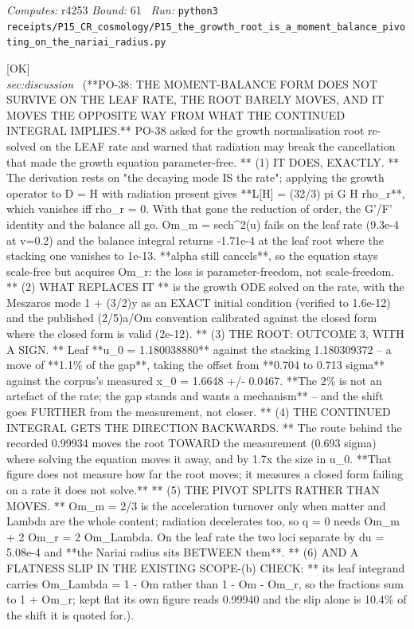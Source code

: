 \begin{description}
\emph{Computes:} r4253
 \emph{Bound:} 61
\ \emph{Run:} \texttt{python3 receipts/P15\_CR\_cosmology/P15\_the\_growth\_root\_is\_a\_moment\_balance\_pivoting\_on\_the\_nariai\_radius.py}
\item[\rcptlabel{P15_the_growth_root_on_the_leaf_rate_is_not_a_moment_balance_and_the_gap_stands}{P15R13}\textbf{P15R13}\quad\texttt{P15\_the\_growth\_root\_on\_the\_leaf\_rate\_is\_not\_a\_moment\_balance\_and\_the\_gap\_stands}]\hfill\textsf{[OK]}\\
\textit{sec:discussion} \ (**PO-38: THE MOMENT-BALANCE FORM DOES NOT SURVIVE ON THE LEAF RATE, THE ROOT BARELY MOVES, AND IT MOVES THE OPPOSITE WAY FROM WHAT THE CONTINUED INTEGRAL IMPLIES.** PO-38 asked for the growth normalisation root re-solved on the LEAF rate and warned that radiation may break the cancellation that made the growth equation parameter-free. ** (1) IT DOES, EXACTLY. ** The derivation rests on "the decaying mode IS the rate"; applying the growth operator to D = H with radiation present gives **L[H] = (32/3) pi G H rho\_r**, which vanishes iff rho\_r = 0. With that gone the reduction of order, the G'/F' identity and the balance all go. Om\_m = sech\textasciicircum{}2(u) fails on the leaf rate (9.3e-4 at v=0.2) and the balance integral returns -1.71e-4 at the leaf root where the stacking one vanishes to 1e-13. **alpha still cancels**, so the equation stays scale-free but acquires Om\_r: the loss is parameter-freedom, not scale-freedom. ** (2) WHAT REPLACES IT ** is the growth ODE solved on the rate, with the Meszaros mode 1 + (3/2)y as an EXACT initial condition (verified to 1.6e-12) and the published (2/5)a/Om convention calibrated against the closed form where the closed form is valid (2e-12). ** (3) THE ROOT: OUTCOME 3, WITH A SIGN. ** Leaf **u\_0 = 1.180038880** against the stacking 1.180309372 -- a move of **1.1\% of the gap**, taking the offset from **0.704 to 0.713 sigma** against the corpus's measured x\_0 = 1.6648 +/- 0.0467. **The 2\% is not an artefact of the rate; the gap stands and wants a mechanism** -- and the shift goes FURTHER from the measurement, not closer. ** (4) THE CONTINUED INTEGRAL GETS THE DIRECTION BACKWARDS. ** The route behind the recorded 0.99934 moves the root TOWARD the measurement (0.693 sigma) where solving the equation moves it away, and by 1.7x the size in u\_0. **That figure does not measure how far the root moves; it measures a closed form failing on a rate it does not solve.** ** (5) THE PIVOT SPLITS RATHER THAN MOVES. ** Om\_m = 2/3 is the acceleration turnover only when matter and Lambda are the whole content; radiation decelerates too, so q = 0 needs Om\_m + 2 Om\_r = 2 Om\_Lambda. On the leaf rate the two loci separate by du = 5.08e-4 and **the Nariai radius sits BETWEEN them**. ** (6) AND A FLATNESS SLIP IN THE EXISTING SCOPE-(b) CHECK: ** its leaf integrand carries Om\_Lambda = 1 - Om rather than 1 - Om - Om\_r, so the fractions sum to 1 + Om\_r; kept flat its own figure reads 0.99940 and the slip alone is 10.4\% of the shift it is quoted for.). 

\end{description}
